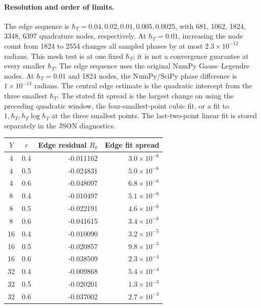 \paragraph{Resolution and order of limits.}
The edge sequence is $\hbar_T=0.04,0.02,0.01,0.005,0.0025$,
with 681, 1062, 1824, 3348, 6397 quadrature nodes, respectively.
At $\hbar_T=0.01$, increasing the node count from 1824 to 2554 changes all sampled phases by at most $2.3\times10^{-12}$ radians. This mesh test is at one fixed $\hbar_T$;
it is not a convergence guarantee at every smaller $\hbar_T$.
The edge sequence uses the original NumPy Gauss--Legendre nodes.
At $\hbar_T=0.01$ and 1824 nodes, the NumPy/SciPy phase difference is $1\times10^{-12}$ radians.
The central edge estimate is the quadratic intercept from the three
smallest $\hbar_T$. The stated fit spread is the largest change on using
the preceding quadratic window, the four-smallest-point cubic fit, or
a fit to $1,\hbar_T,\hbar_T\log\hbar_T$ at the three smallest points.
The last-two-point linear fit is stored separately in the JSON diagnostics.
\begin{center}\small
\begin{tabular}{@{}ccrr@{}}\toprule
$Y$ & $r$ & Edge residual $R_0$ & Edge fit spread\\\midrule
4 & 0.4 & -0.011162 & $3.0\times10^{-6}$\\
4 & 0.5 & -0.024831 & $5.0\times10^{-6}$\\
4 & 0.6 & -0.048097 & $6.8\times10^{-6}$\\
8 & 0.4 & -0.010497 & $5.1\times10^{-6}$\\
8 & 0.5 & -0.022191 & $4.6\times10^{-6}$\\
8 & 0.6 & -0.041615 & $3.4\times10^{-6}$\\
16 & 0.4 & -0.010090 & $3.2\times10^{-5}$\\
16 & 0.5 & -0.020857 & $9.8\times10^{-5}$\\
16 & 0.6 & -0.038509 & $2.3\times10^{-4}$\\
32 & 0.4 & -0.009868 & $5.4\times10^{-4}$\\
32 & 0.5 & -0.020201 & $1.3\times10^{-3}$\\
32 & 0.6 & -0.037002 & $2.7\times10^{-3}$\\
\bottomrule\end{tabular}\end{center}
